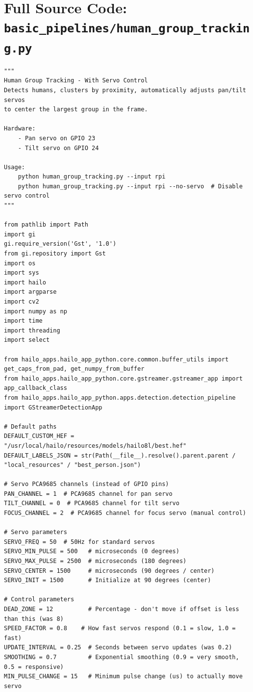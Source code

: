 \documentclass[11pt,a4paper]{article}
\begin{document}
\newpage
\section{Full Source Code: \texttt{basic\_pipelines/human\_group\_tracking.py}}
\begin{lstlisting}
"""
Human Group Tracking - With Servo Control
Detects humans, clusters by proximity, automatically adjusts pan/tilt servos
to center the largest group in the frame.

Hardware:
    - Pan servo on GPIO 23
    - Tilt servo on GPIO 24

Usage:
    python human_group_tracking.py --input rpi
    python human_group_tracking.py --input rpi --no-servo  # Disable servo control
"""

from pathlib import Path
import gi
gi.require_version('Gst', '1.0')
from gi.repository import Gst
import os
import sys
import hailo
import argparse
import cv2
import numpy as np
import time
import threading
import select

from hailo_apps.hailo_app_python.core.common.buffer_utils import get_caps_from_pad, get_numpy_from_buffer
from hailo_apps.hailo_app_python.core.gstreamer.gstreamer_app import app_callback_class
from hailo_apps.hailo_app_python.apps.detection.detection_pipeline import GStreamerDetectionApp

# Default paths
DEFAULT_CUSTOM_HEF = "/usr/local/hailo/resources/models/hailo8l/best.hef"
DEFAULT_LABELS_JSON = str(Path(__file__).resolve().parent.parent / "local_resources" / "best_person.json")

# Servo PCA9685 channels (instead of GPIO pins)
PAN_CHANNEL = 1  # PCA9685 channel for pan servo
TILT_CHANNEL = 0  # PCA9685 channel for tilt servo
FOCUS_CHANNEL = 2  # PCA9685 channel for focus servo (manual control)

# Servo parameters
SERVO_FREQ = 50  # 50Hz for standard servos
SERVO_MIN_PULSE = 500   # microseconds (0 degrees)
SERVO_MAX_PULSE = 2500  # microseconds (180 degrees)
SERVO_CENTER = 1500     # microseconds (90 degrees / center)
SERVO_INIT = 1500       # Initialize at 90 degrees (center)

# Control parameters
DEAD_ZONE = 12          # Percentage - don't move if offset is less than this (was 8)
SPEED_FACTOR = 0.8    # How fast servos respond (0.1 = slow, 1.0 = fast)
UPDATE_INTERVAL = 0.25  # Seconds between servo updates (was 0.2)
SMOOTHING = 0.7         # Exponential smoothing (0.9 = very smooth, 0.5 = responsive)
MIN_PULSE_CHANGE = 15   # Minimum pulse change (us) to actually move servo


\end{lstlisting}
\end{document}
